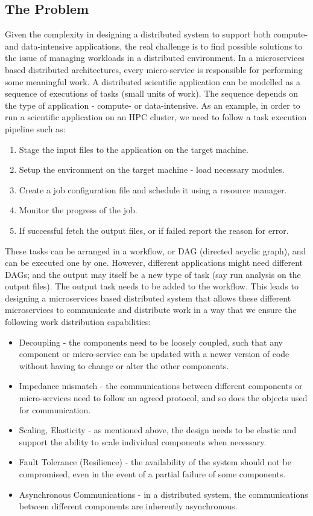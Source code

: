 \documentclass[sigconf]{acmart}
\begin{document}
\subsection{The Problem}
Given the complexity in designing a distributed system to support both compute- and data-intensive applications, the real challenge is to find possible solutions to the issue of managing workloads in a distributed environment. In a microservices based distributed architectures, every micro-service is responsible for performing some meaningful work. A distributed scientific application can be modelled as a sequence of executions of tasks (small units of work). The sequence depends on the type of application - compute- or data-intensive. As an example, in order to run a scientific application on an HPC cluster, we need to follow a task execution pipeline such as:

\begin{enumerate}
\item Stage the input files to the application on the target machine.
\item Setup the environment on the target machine - load necessary modules.
\item Create a job configuration file and schedule it using a resource manager.
\item Monitor the progress of the job.
\item If successful fetch the output files, or if failed report the reason for error.
\end{enumerate}

These tasks can be arranged in a workflow, or DAG (directed acyclic graph), and can be executed one by one. However,  different applications might need different DAGs; and the output may itself be a new type of task (say run analysis on the output files).  The output task needs to be added to the workflow. This leads to designing a microservices based distributed system that allows these different microservices to communicate and distribute work in a way that we ensure the following work distribution capabilities:

\begin{itemize}
\item Decoupling - the components need to be loosely coupled, such that any component or micro-service can be updated with a newer version of code without having to change or alter the other components.
\item Impedance mismatch - the communications between different components or micro-services need to follow an agreed protocol, and so does the objects used for communication. 
\item Scaling, Elasticity - as mentioned above, the design needs to be elastic and support the ability to scale individual components when necessary.
\item Fault Tolerance (Resilience) - the availability of the system should not be compromised, even in the event of a partial failure of some components. 
\item Asynchronous Communications - in a distributed system, the communications between different components are inherently asynchronous. 
\end{itemize}	
\end{document}
